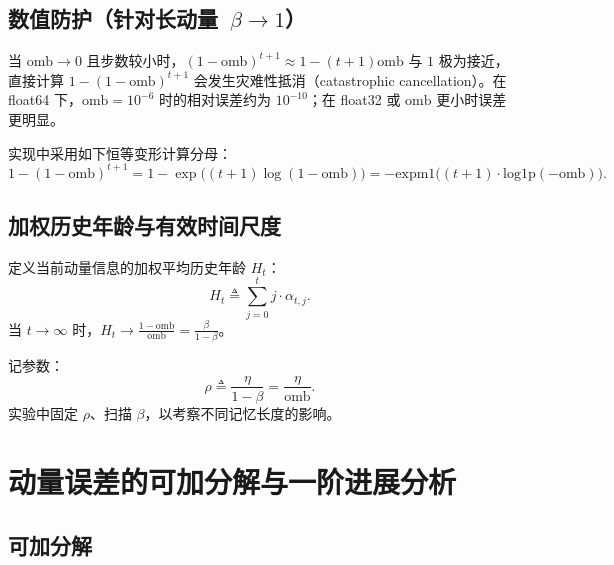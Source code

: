 \documentclass[11pt, a4paper, UTF8]{ctexart}
\begin{document}
\subsection{数值防护（针对长动量~\texorpdfstring{$\beta \to 1$}{beta -> 1}）}

\begin{warningbox}[数值实现]
当 $\mathrm{omb} \to 0$ 且步数较小时，$(1 - \mathrm{omb})^{t+1} \approx 1 - (t+1)\mathrm{omb}$ 与 $1$ 极为接近，直接计算 $1 - (1 - \mathrm{omb})^{t+1}$ 会发生灾难性抵消（catastrophic cancellation）。在 float64 下，$\mathrm{omb} = 10^{-6}$ 时的相对误差约为 $10^{-10}$；在 float32 或 $\mathrm{omb}$ 更小时误差更明显。

实现中采用如下恒等变形计算分母：
\begin{equation}
    1 - (1 - \mathrm{omb})^{t+1} = 1 - \exp\Big( (t+1) \log(1 - \mathrm{omb}) \Big) = -\mathrm{expm1}\Big( (t+1) \cdot \mathrm{log1p}(-\mathrm{omb}) \Big).
\end{equation}
\end{warningbox}

\subsection{加权历史年龄与有效时间尺度}

定义当前动量信息的加权平均历史年龄 $H_t$：
\begin{equation}
    H_t \triangleq \sum_{j=0}^t j \cdot \alpha_{t, j}.
\end{equation}
当 $t \to \infty$ 时，$H_t \to \frac{1 - \mathrm{omb}}{\mathrm{omb}} = \frac{\beta}{1 - \beta}$。

记参数：
\begin{equation}
    \rho \triangleq \frac{\eta}{1 - \beta} = \frac{\eta}{\mathrm{omb}}.
\end{equation}
实验中固定 $\rho$、扫描 $\beta$，以考察不同记忆长度的影响。

\section{动量误差的可加分解与一阶进展分析}

\subsection{可加分解}
\end{document}
